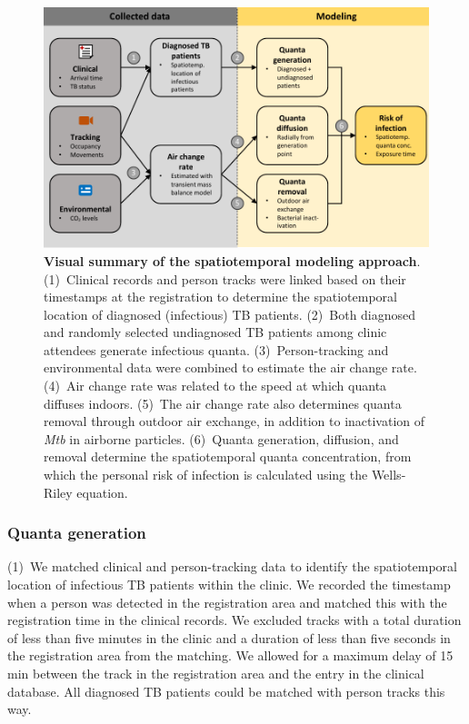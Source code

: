 \documentclass[fleqn,11pt]{wlscirep}
\begin{document}
\begin{figure}[!htpb]
    \centering
    \includegraphics{doc/model-flow-chart.pdf}
    \caption{\textbf{Visual summary of the spatiotemporal modeling approach}. (1)~Clinical records and person tracks were linked based on their timestamps at the registration to determine the spatiotemporal location of diagnosed (infectious) TB patients. (2)~Both diagnosed and randomly selected undiagnosed TB patients among clinic attendees generate infectious quanta. (3)~Person-tracking and environmental data were combined to estimate the air change rate. (4)~Air change rate was related to the speed at which quanta diffuses indoors. (5)~The air change rate also determines quanta removal through outdoor air exchange, in addition to inactivation of \emph{Mtb} in airborne particles. (6)~Quanta generation, diffusion, and removal determine the spatiotemporal quanta concentration, from which the personal risk of infection is calculated using the Wells-Riley equation.}
    \label{fig:modeling-flow}
\end{figure}

\subsubsection*{Quanta generation}

(1)~We matched clinical and person-tracking data to identify the spatiotemporal location of infectious TB patients within the clinic. We recorded the timestamp when a person was detected in the registration area and matched this with the registration time in the clinical records. We excluded tracks with a total duration of less than five minutes in the clinic and a duration of less than five seconds in the registration area from the matching. We allowed for a maximum delay of 15\,min between the track in the registration area and the entry in the clinical database. All diagnosed TB patients could be matched with person tracks this way. 
\end{document}
